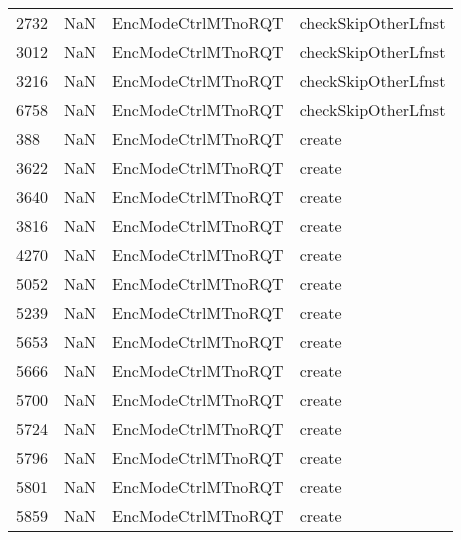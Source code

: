 \begin{tabular}{llll}
2732 &                   NaN &         EncModeCtrlMTnoRQT &                       checkSkipOtherLfnst \\
3012 &                   NaN &         EncModeCtrlMTnoRQT &                       checkSkipOtherLfnst \\
3216 &                   NaN &         EncModeCtrlMTnoRQT &                       checkSkipOtherLfnst \\
6758 &                   NaN &         EncModeCtrlMTnoRQT &                       checkSkipOtherLfnst \\
388  &                   NaN &         EncModeCtrlMTnoRQT &                                    create \\
3622 &                   NaN &         EncModeCtrlMTnoRQT &                                    create \\
3640 &                   NaN &         EncModeCtrlMTnoRQT &                                    create \\
3816 &                   NaN &         EncModeCtrlMTnoRQT &                                    create \\
4270 &                   NaN &         EncModeCtrlMTnoRQT &                                    create \\
5052 &                   NaN &         EncModeCtrlMTnoRQT &                                    create \\
5239 &                   NaN &         EncModeCtrlMTnoRQT &                                    create \\
5653 &                   NaN &         EncModeCtrlMTnoRQT &                                    create \\
5666 &                   NaN &         EncModeCtrlMTnoRQT &                                    create \\
5700 &                   NaN &         EncModeCtrlMTnoRQT &                                    create \\
5724 &                   NaN &         EncModeCtrlMTnoRQT &                                    create \\
5796 &                   NaN &         EncModeCtrlMTnoRQT &                                    create \\
5801 &                   NaN &         EncModeCtrlMTnoRQT &                                    create \\
5859 &                   NaN &         EncModeCtrlMTnoRQT &                                    create \\

\end{tabular}
